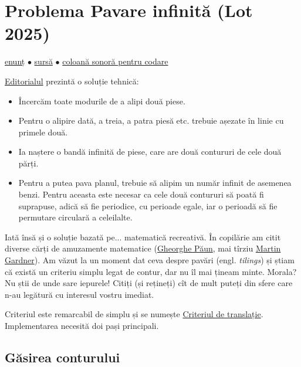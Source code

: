 \documentclass[../main.tex]{subfiles}
\begin{document}
\section{Problema Pavare infinită (Lot 2025)}
\label{problem:pavare-infinită}

\href{https://kilonova.ro/problems/3793}{enunț}
$\bullet$
\hyperref[code:pavare-infinită]{sursă}
$\bullet$
\href{https://www.youtube.com/watch?v=wH-DvxDh_nw}{coloană sonoră pentru codare}

\href{https://drive.google.com/drive/folders/1-A5BjiaxuC3dEPpeFdaC-oqiVXvnj1TN}{Editorialul} prezintă o soluție tehnică:

\begin{itemize}
  \item Încercăm toate modurile de a alipi două piese.

  \item Pentru o alipire dată, a treia, a patra piesă etc. trebuie așezate în linie cu primele două.

  \item Ia naștere o bandă infinită de piese, care are două contururi de cele două părți.

  \item Pentru a putea pava planul, trebuie să alipim un număr infinit de asemenea benzi. Pentru aceasta este necesar ca cele două contururi să poată fi suprapuse, adică să fie periodice, cu perioade egale, iar o perioadă să fie permutare circulară a celeilalte.
\end{itemize}

Iată însă și o soluție bazată pe... matematică recreativă. În copilărie am citit diverse cărți de amuzamente matematice (\href{https://ro.wikipedia.org/wiki/Gheorghe_P\%C4\%83un\#C\%C4\%83r\%C8\%9Bi_de_cultur\%C4\%83_\%C8\%99tiin\%C8\%9Bific\%C4\%83}{Gheorghe Păun}, mai tîrziu \href{https://en.wikipedia.org/wiki/Martin_Gardner_bibliography}{Martin Gardner}). Am văzut la un moment dat ceva despre pavări (engl. \textit{tilings}) și știam că există un criteriu simplu legat de contur, dar nu îl mai țineam minte. Morala? Nu știi de unde sare iepurele! Citiți (și rețineți) cît de mult puteți din sfere care n-au legătură cu interesul vostru imediat.

Criteriul este remarcabil de simplu și se numește \href{https://minos.tessera.li/tiling}{Criteriul de translație}. Implementarea necesită doi pași principali.

\subsection{Găsirea conturului}
\end{document}

